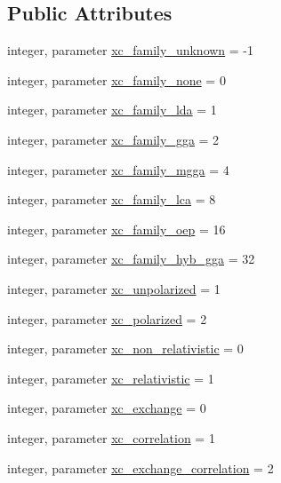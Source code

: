 \subsection*{Public Attributes}
\begin{DoxyCompactItemize}
\item 
integer, parameter \hyperlink{classxc__f90__lib__m_a72feb122f223775b0ed8621072aa0691}{xc\-\_\-family\-\_\-unknown} = -\/1
\item 
integer, parameter \hyperlink{classxc__f90__lib__m_a81e78be5ade262df9cd5d7f240a9a4f4}{xc\-\_\-family\-\_\-none} = 0
\item 
integer, parameter \hyperlink{classxc__f90__lib__m_adee6409373afd645d6eea8bd8e4a1eb3}{xc\-\_\-family\-\_\-lda} = 1
\item 
integer, parameter \hyperlink{classxc__f90__lib__m_af607b9deb44b29c87f5b08e82a8eb484}{xc\-\_\-family\-\_\-gga} = 2
\item 
integer, parameter \hyperlink{classxc__f90__lib__m_a46eb5b3dd856ee8298941daed45d088c}{xc\-\_\-family\-\_\-mgga} = 4
\item 
integer, parameter \hyperlink{classxc__f90__lib__m_a4ff2f3f5248f15b4488f7a4e6c806366}{xc\-\_\-family\-\_\-lca} = 8
\item 
integer, parameter \hyperlink{classxc__f90__lib__m_a6f366282a2a2d9c0ab1c218d6106d106}{xc\-\_\-family\-\_\-oep} = 16
\item 
integer, parameter \hyperlink{classxc__f90__lib__m_a59454c43ef542f3201b310a7b9b5c843}{xc\-\_\-family\-\_\-hyb\-\_\-gga} = 32
\item 
integer, parameter \hyperlink{classxc__f90__lib__m_a3badde9a49d8b0af1a2d905e74b66ddd}{xc\-\_\-unpolarized} = 1
\item 
integer, parameter \hyperlink{classxc__f90__lib__m_abbb2ce70bddd6f2224beeb1177b9a107}{xc\-\_\-polarized} = 2
\item 
integer, parameter \hyperlink{classxc__f90__lib__m_a5e7e9fc87cf15161b57eb9b9f1f50190}{xc\-\_\-non\-\_\-relativistic} = 0
\item 
integer, parameter \hyperlink{classxc__f90__lib__m_a73815eca09904ca3234788474c3b62d0}{xc\-\_\-relativistic} = 1
\item 
integer, parameter \hyperlink{classxc__f90__lib__m_a551dd13874717476b945c28b0404bcd9}{xc\-\_\-exchange} = 0
\item 
integer, parameter \hyperlink{classxc__f90__lib__m_acdf651e6c31fec0f068ec07404200789}{xc\-\_\-correlation} = 1
\item 
integer, parameter \hyperlink{classxc__f90__lib__m_a163202bbf67d5c8c3f0179f2703312bb}{xc\-\_\-exchange\-\_\-correlation} = 2

\end{DoxyCompactItemize}
